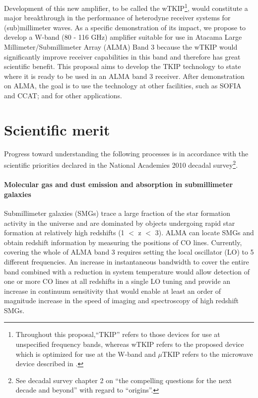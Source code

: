 Development of this new amplifier, to be called the wTKIP\footnote{Throughout this proposal,``TKIP'' refers to those devices for use at unspecified frequency bands, whereas wTKIP refers to the proposed device which is optimized for use at the W-band and $\mu$TKIP refers to the microwave device described in \cite{Eom2012} \label{foot:TKIP}.}, would constitute a major breakthrough in the performance of heterodyne receiver systems for (sub)millimeter waves. As a specific demonstration of its impact, we propose to develop a W-band  (80 - 116 GHz) amplifier suitable for use in Atacama Large Millimeter/Submillimeter Array (ALMA) Band 3 because the wTKIP would significantly improve receiver capabilities in this band and therefore has great scientific benefit. This proposal aims to develop the TKIP technology to  state where it is ready to be used in an ALMA band 3 receiver. After demonstration on ALMA, the goal is to use the technology at other facilities, such as SOFIA and CCAT; and for other applications.



\section{Scientific merit}
Progress toward understanding the following processes is in accordance with the scientific priorities declared in the National Academies 2010 decadal survey\footnote{See decadal survey chapter 2 on ``the compelling questions for the next decade and beyond'' with regard to ``origins''.}. 

\paragraph*{Molecular gas and dust emission and absorption in submillimeter galaxies}
Submillimeter galaxies (SMGs) trace a large fraction of the star formation activity in the universe and are dominated by objects undergoing rapid star formation at relatively high redshifts (1 $<$ z $<$ 3). ALMA can locate SMGs  and obtain redshift information by measuring the positions of CO lines. Currently, covering the whole of ALMA band 3 requires setting the local oscillator (LO) to 5 different frequencies. An increase in instantaneous bandwidth to cover the entire band combined with a reduction in system temperature would allow detection of one or more CO lines at all redshifts in a single LO tuning and provide an increase in continuum sensitivity that would enable at least an order of magnitude increase in the speed of imaging and spectroscopy of high redshift SMGs.

